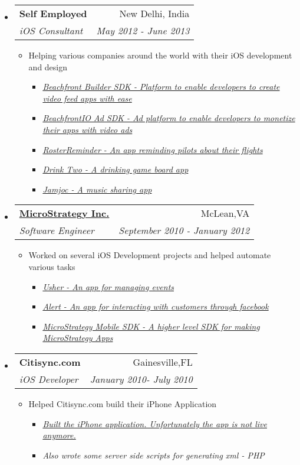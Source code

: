 \documentclass[letterpaper,11pt]{article}
\makeatletter
\newcommand{\resitem}[1]{\item #1 \vspace{-2pt}}
\newcommand{\ressubheading}[4]{
\begin{tabular*}{7.0in}{l@{\extracolsep{\fill}}r}
		\textbf{#1} & #2 \\
		\textit{#3} & \textit{#4} \\
\end{tabular*}\vspace{-6pt}}
\makeatother
\begin{document}
\begin{itemize}
\vspace{0.4in}

\item
    \ressubheading{{Self Employed}}{New Delhi, India}{iOS Consultant}{May 2012 - June 2013}
    \begin{itemize}
        \resitem{Helping various companies around the world with their iOS development and design}
        \begin{itemize}
           \resitem{\href{https://github.com/beachfront/videosdk-ios}{\emph{Beachfront Builder SDK - Platform to enable developers to create video feed apps with ease}}}
          \resitem{\href{https://github.com/beachfront/beachfront-io-ios-sdk}{\emph{BeachfrontIO Ad SDK - Ad platform to enable developers to monetize their apps with video ads}}}
           \resitem{\href{https://itunes.apple.com/us/app/sg-pilots-roster-reminder/id561001503}{\emph{RosterReminder - An app reminding pilots about their flights}}}
            \resitem{\href{https://itunes.apple.com/tr/app/drink-two-college-party-drinking/id590014833?mt=8}{\emph{Drink Two - A drinking game board app}}}
            \resitem{\href{https://itunes.apple.com/us/app/earhead/id585869906?mt=8}{\emph{Jamjoc - A music sharing app}}}
        \end{itemize}
    \end{itemize}

\item
    \ressubheading{\href{http://www.microstrategy.com/Company}{MicroStrategy Inc.}}{McLean,VA}{Software Engineer}{September 2010 - January 2012}
    \begin{itemize}
        \resitem{Worked on several iOS Development projects and helped automate various tasks}
        \begin{itemize}
            \resitem{\href{http://itunes.apple.com/us/app/usher-by-microstrategy/id477543403}{\emph{Usher - An app for managing events}}}
             \resitem{\href{http://itunes.apple.com/us/app/alert-for-iphone/id442981988?mt=8&ls=1}{\emph{Alert - An app for interacting with customers through facebook}}}
               \resitem{ \href{http://www.microstrategy.com/mobile/}{\emph{MicroStrategy Mobile SDK - A higher level SDK for making MicroStrategy Apps}}}
        \end{itemize}
    \end{itemize}

\item
    \ressubheading{Citisync.com}{Gainesville,FL}{iOS Developer}{January 2010- July 2010}
    \begin{itemize}
        \resitem{Helped Citisync.com build their iPhone Application}
        \begin{itemize}
            \resitem{\href{http://www.alligator.org/news/campus/article_8fe50876-c78b-11df-96a3-001cc4c03286.html}{\emph{Built the iPhone application. Unfortunately the app is not live anymore.}}}
           \resitem{\emph{Also wrote some server side scripts for generating xml - PHP}}
        \end{itemize}
    \end{itemize}


\end{itemize}
\end{document}
